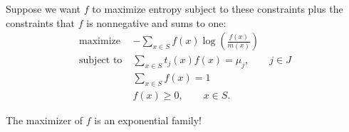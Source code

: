 \documentclass[
  ignorenonframetext,
]{beamer}
\begin{document}
\begin{frame}{}
\protect\hypertarget{section-12}{}
Suppose we want \(f\) to maximize entropy subject to these constraints
plus the constraints that \(f\) is nonnegative and sums to one:
\begin{align*}
    \text{maximize} \;& -\sum_{x \in S} f(x)\log\left(\frac{f(x)}{m(x)}\right) \\
    \text{subject to} \;& \sum_{x\in S} t_j(x)f(x) = \mu_j, \qquad j \in J \\
    &\sum_{x \in S} f(x) = 1 \\
    &f(x) \geq 0, \qquad x \in S.
\end{align*}

\vspace{12pt}

The maximizer of \(f\) is an exponential family!
\end{frame}
\end{document}
